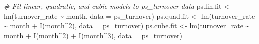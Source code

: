 \documentclass[
]{book}
\newenvironment{Shaded}{\begin{snugshade}}{\end{snugshade}}
\newcommand{\AttributeTok}[1]{\textcolor[rgb]{0.77,0.63,0.00}{#1}}
\newcommand{\CommentTok}[1]{\textcolor[rgb]{0.56,0.35,0.01}{\textit{#1}}}
\newcommand{\DecValTok}[1]{\textcolor[rgb]{0.00,0.00,0.81}{#1}}
\newcommand{\FunctionTok}[1]{\textcolor[rgb]{0.00,0.00,0.00}{#1}}
\newcommand{\NormalTok}[1]{#1}
\newcommand{\OtherTok}[1]{\textcolor[rgb]{0.56,0.35,0.01}{#1}}
\newcommand{\SpecialCharTok}[1]{\textcolor[rgb]{0.00,0.00,0.00}{#1}}
\begin{document}
\begin{Shaded}
\begin{Highlighting}[]
\CommentTok{\# Fit linear, quadratic, and cubic models to ps\_turnover data}
\NormalTok{ps.lin.fit }\OtherTok{\textless{}{-}} \FunctionTok{lm}\NormalTok{(turnover\_rate }\SpecialCharTok{\textasciitilde{}}\NormalTok{ month, }\AttributeTok{data =}\NormalTok{ ps\_turnover)}
\NormalTok{ps.quad.fit }\OtherTok{\textless{}{-}} \FunctionTok{lm}\NormalTok{(turnover\_rate }\SpecialCharTok{\textasciitilde{}}\NormalTok{ month }\SpecialCharTok{+} \FunctionTok{I}\NormalTok{(month}\SpecialCharTok{\^{}}\DecValTok{2}\NormalTok{), }\AttributeTok{data =}\NormalTok{ ps\_turnover)}
\NormalTok{ps.cube.fit }\OtherTok{\textless{}{-}} \FunctionTok{lm}\NormalTok{(turnover\_rate }\SpecialCharTok{\textasciitilde{}}\NormalTok{ month }\SpecialCharTok{+} \FunctionTok{I}\NormalTok{(month}\SpecialCharTok{\^{}}\DecValTok{2}\NormalTok{) }\SpecialCharTok{+} \FunctionTok{I}\NormalTok{(month}\SpecialCharTok{\^{}}\DecValTok{3}\NormalTok{), }\AttributeTok{data =}\NormalTok{ ps\_turnover)}
\end{Highlighting}
\end{Shaded}

\providecommand{\docline}[3]{\noalign{\global\setlength{\arrayrulewidth}{#1}}\arrayrulecolor[HTML]{#2}\cline{#3}}

\setlength{\tabcolsep}{2pt}

\renewcommand*{\arraystretch}{1.5}
\end{document}
